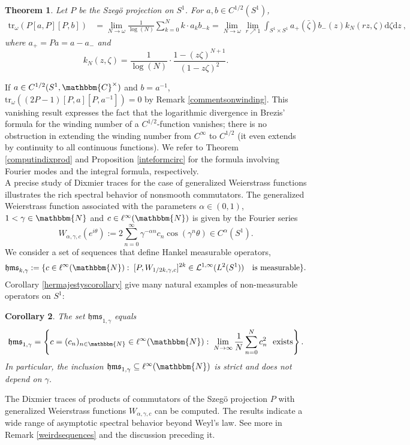 \documentclass[10pt]{amsart}
\newtheorem{thm*}{Theorem}
\newtheorem{cor*}[thm*]{Corollary}
\theoremstyle{remark}
\theoremstyle{definition}
\begin{document}
\begin{thm*}\label{introszegothm}
Let $P$ be the Szeg\"{o} projection on $S^1$. For $a,b\in C^{1/2}(S^1)$,
\begin{align*}
{\mathrm{t}\mathrm{r}}_\omega(P[a,P][P,b])&=\lim_{N\to \omega} \frac{1}{\log(N)}\sum_{k=0}^Nk\cdot a_k b_{-k}=\lim_{N\to \omega} \lim_{r\nearrow 1}\int_{S^1\times S^1} a_+(\bar{\zeta})b_-(z)k_N(rz,\zeta){\mathrm{d}} \zeta{\mathrm{d}} z\ ,
\end{align*}
where $a_+ = Pa = a - a_-$ and
$$k_N(z,\zeta)=\frac{1}{\log (N)}\cdot \frac{1-(z\zeta)^{N+1}}{(1-z\zeta)^2}.$$
\end{thm*}

If $a\in C^{1/2}(S^1,{\mathbbm{C}}^\times)$ and $b=a^{-1}$, ${\mathrm{t}\mathrm{r}}_\omega((2P-1)[P,a][P,a^{-1}])=0$ by Remark \ref{commentsonwinding}. This vanishing result expresses the fact that the logarithmic divergence in Brezis' formula for the winding number of a $C^{1/2}$-function vanishes; there is no obstruction in extending the winding number from $C^\infty$ to $C^{1/2}$ (it even extends by continuity to all continuous functions). We refer to Theorem \ref{computindixprod} and Proposition \ref{inteformcirc} for the formula involving Fourier modes and the integral formula, respectively.\\

A precise study of Dixmier traces for the case of generalized Weierstrass functions illustrates the rich spectral behavior of nonsmooth commutators. The generalized Weierstrass function associated with the parameters $\alpha \in (0,1)$, $1<\gamma \in {\mathbbm{N}}$ and $c \in \ell^\infty({\mathbbm{N}})$ is given by the Fourier series
\begin{equation*}
W_{\alpha,\gamma,c}(e^{i \theta}):=2\sum_{n=0}^\infty \gamma^{-\alpha n}c_n\cos(\gamma^n \theta) \in C^\alpha(S^1).
\end{equation*}
We consider a set of sequences that define Hankel measurable operators,
$$\mathfrak{hms}_{k,\gamma}:=\{c\in \ell^\infty({\mathbbm{N}}): \; [P,W_{1/2k,\gamma,c}]^{2k}\in \mathcal{L}^{1,\infty}(L^2(S^1)) \quad \mbox{is measurable}\}.$$
Corollary \ref{hermajestyscorollary} give many natural examples of non-measurable operators on $S^1$: 
\begin{cor*}
\label{hermajestyscorollaryintro}
The set $\mathfrak{hms}_{1,\gamma}$ equals
$$\mathfrak{hms}_{1,\gamma}=\left\{c=(c_n)_{n\in {\mathbbm{N}}}\in \ell^\infty({\mathbbm{N}}): \; \lim_{N \to \infty} \frac{1}{N}\sum_{n=0}^{N} c_n^2\ \ \text{exists}\right\}.$$
In particular, the inclusion $\mathfrak{hms}_{1,\gamma}\subseteq \ell^\infty({\mathbbm{N}})$ is strict and does not depend on $\gamma$.
\end{cor*}
The Dixmier traces of products of commutators of the Szeg\"{o} projection $P$ with generalized Weierstrass functions $W_{\alpha,\gamma,c}$ can be computed. The results indicate a wide range of asymptotic spectral behavior beyond Weyl's law. See more in Remark \ref{weirdsequences} and the discussion preceding it.\\
\end{document}
